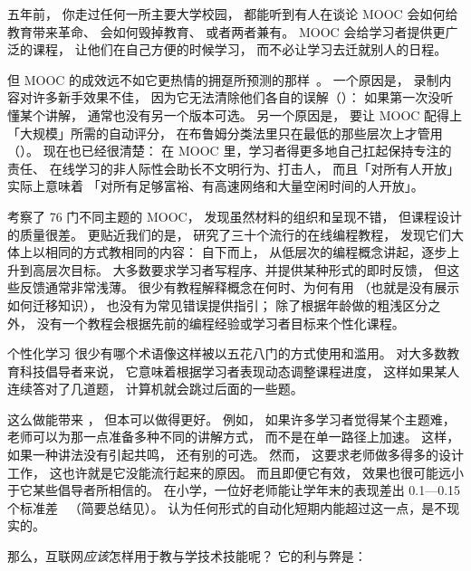 五年前，
你走过任何一所主要大学校园，
都能听到有人在谈论 MOOC 会如何给教育带来革命、
会如何毁掉教育、
或者两者兼有。
MOOC 会给学习者提供更广泛的课程，
让他们在自己方便的时候学习，
而不必让学习去迁就别人的日程。

但 MOOC 的成效远不如它更热情的拥趸所预测的那样~\cite{Ubel2017}。
一个原因是，
录制内容对许多新手效果不佳，
因为它无法清除他们各自的误解（）：
如果第一次没听懂某个讲解，
通常也没有另一个版本可选。
另一个原因是，
要让 MOOC 配得上「大规模」所需的自动评分，
在布鲁姆分类法里只在最低的那些层次上才管用（）。
现在也已经很清楚：
在 MOOC 里，学习者得更多地自己扛起保持专注的责任、
在线学习的非人际性会助长不文明行为、打击人，
而且「对所有人开放」实际上意味着
「对所有足够富裕、有高速网络和大量空闲时间的人开放」。

\cite{Marg2015}考察了 76 门不同主题的 MOOC，
发现虽然材料的组织和呈现不错，
但课程设计的质量很差。
更贴近我们的是，
\cite{Kim2017}研究了三十个流行的在线编程教程，
发现它们大体上以相同的方式教相同的内容：
自下而上，
从低层次的编程概念讲起，逐步上升到高层次目标。
大多数要求学习者写程序、并提供某种形式的即时反馈，
但这些反馈通常非常浅薄。
很少有教程解释概念在何时、为何有用
（也就是没有展示如何迁移知识），
也没有为常见错误提供指引；
除了根据年龄做的粗浅区分之外，
没有一个教程会根据先前的编程经验或学习者目标来个性化课程。

\begin{aside}{个性化学习}
  很少有哪个术语像这样被以五花八门的方式使用和滥用。
  对大多数教育科技倡导者来说，
  它意味着根据学习者表现动态调整课程进度，
  这样如果某人连续答对了几道题，
  计算机就会跳过后面的一些题。

  这么做能带来
  ，
  但本可以做得更好。
  例如，
  如果许多学习者觉得某个主题难，
  老师可以为那一点准备多种不同的讲解方式，
  而不是在单一路径上加速。
  这样，
  如果一种讲法没有引起共鸣，
  还有别的可选。
  然而，
  这要求老师做多得多的设计工作，
  这也许就是它没能流行起来的原因。
  而且即便它有效，
  效果也很可能远小于它某些倡导者所相信的。
  在小学，一位好老师能让学年末的表现差出 0.1—0.15 个标准差~\cite{Chet2014}
  （简要总结见）。
  认为任何形式的自动化短期内能超过这一点，是不现实的。
\end{aside}

那么，互联网\emph{应该}怎样用于教与学技术技能呢？
它的利与弊是：

